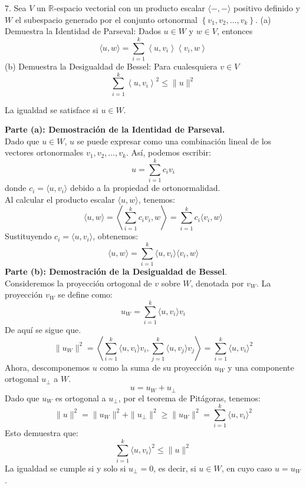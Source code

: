 7. Sea \( V \) un \( \mathbb{R} \)-espacio vectorial con un producto escalar \( \langle-,-\rangle \) positivo definido y \( W \) el subespacio generado por el conjunto ortonormal \( \left\{v_{1}, v_{2}, \ldots, v_{k}\right\} \).
(a) Demuestra la Identidad de Parseval: Dados \( u \in W \) y \( w \in V \), entonces
\[
\langle u, w\rangle=\sum_{i=1}^{k}\left\langle u, v_{i}\right\rangle\left\langle v_{i}, w\right\rangle
\]
(b) Demuestra la Desigualdad de Bessel: Para cualesquiera \( v \in V \)
\[
\sum_{i=1}^{k}\left\langle u, v_{i}\right\rangle^{2} \leq\|u\|^{2}
\]

La igualdad se satisface si \( u \in W \). \\

\begin{solution}

\textbf{Parte (a): Demostración de la Identidad de Parseval.} \\
Dado que \( u \in W \), \( u \) se puede expresar como una combinación lineal de los vectores ortonormales \( v_1, v_2, \ldots, v_k \). Así, podemos escribir:
\[
   u = \sum_{i=1}^{k} c_i v_i
   \]
donde \( c_i = \langle u, v_i \rangle \) debido a la propiedad de ortonormalidad.\\
Al calcular el producto escalar \(\langle u, w \rangle\), tenemos: 
\[
   \langle u, w \rangle = \left\langle \sum_{i=1}^{k} c_i v_i, w \right\rangle = \sum_{i=1}^{k} c_i \langle v_i, w \rangle
   \]
Sustituyendo \( c_i = \langle u, v_i \rangle \), obtenemos:
\[
   \langle u, w \rangle = \sum_{i=1}^{k} \langle u, v_i \rangle \langle v_i, w \rangle
   \]
\textbf{Parte (b): Demostración de la Desigualdad de Bessel}.\\
Consideremos la proyección ortogonal de \( v \) sobre \( W \), denotada por \( v_W \). La proyección \( v_W \) se define como:
\[
u_W = \sum_{i=1}^{k} \langle u, v_i \rangle v_i
\]
De aquí se sigue que.
\[
\|u_W\|^2 = \left\langle \sum_{i=1}^{k} \langle u, v_i \rangle v_i, \sum_{j=1}^{k} \langle u, v_j \rangle v_j \right\rangle = \sum_{i=1}^{k} \langle u, v_i \rangle^2
\]
Ahora, descomponemos \( u \) como la suma de su proyección \( u_W \) y una componente ortogonal \( u_\perp \) a \( W \).
\[
u = u_W + u_\perp
\]
Dado que \( u_W \) es ortogonal a \( u_\perp \), por el teorema de Pitágoras, tenemos:
\[
\|u\|^2 = \|u_W\|^2 + \|u_\perp\|^2 \geq \|u_W\|^2 = \sum_{i=1}^{k} \langle u, v_i \rangle^2
\]
Esto demuestra que:
\[
\sum_{i=1}^{k} \langle u, v_i \rangle^2 \leq \|u\|^2
\]
La igualdad se cumple si y solo si \( u_\perp = 0 \), es decir, si \( u \in W \), en cuyo caso \( u = u_W \).


\end{solution}